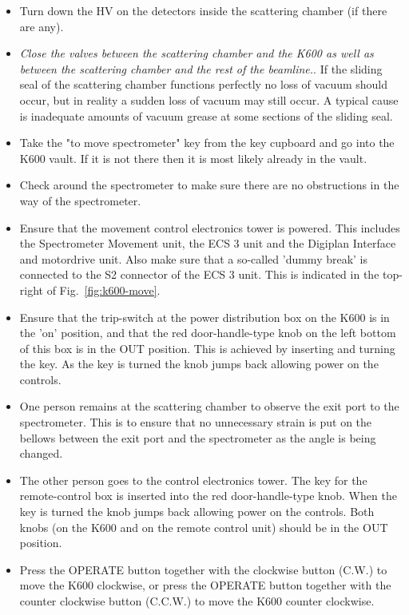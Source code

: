 \documentclass[11pt]{report}
\begin{document}
\begin{itemize}
\item Turn down the HV on the detectors inside the scattering chamber
(if there are any).
\item {\it Close the valves between the scattering chamber and the K600
  as well as between the scattering chamber and the rest of the beamline.}. 
  If the sliding seal of the scattering chamber 
  functions perfectly no loss of vacuum should occur, but in reality
  a sudden loss of vacuum may still occur. A typical cause
  is inadequate amounts of vacuum grease at some sections of the sliding seal.
\item Take the "to move spectrometer" key from the key cupboard and go
  into the K600 vault. If it is not there then it is most likely already in the vault.
\item Check around the spectrometer to make sure there are no 
  obstructions in the way of the spectrometer.     
\item Ensure that the movement control electronics tower is powered. This
  includes the Spectrometer Movement unit, the ECS 3 unit and the Digiplan 
  Interface and motordrive unit. 
  Also make sure that a so-called
  'dummy break' is connected to the S2 connector of the ECS 3 unit.
  This is indicated in the top-right of Fig.~\ref{fig:k600-move}.
\item Ensure that the trip-switch
  at the power distribution box on the K600 
  is in the 'on' position, and that the red door-handle-type knob
  on the left bottom of this  box is in the OUT position.
  This is achieved by inserting and turning the key. As the key is turned the 
  knob jumps back allowing power on the controls.
\item   One person remains at the scattering chamber to observe the 
  exit port to the spectrometer. This is to ensure that no unnecessary 
  strain is put on the bellows between the exit port and the spectrometer
  as the angle is being changed.
\item   The other person goes to the control electronics tower.
  The key for the remote-control box is inserted into the red door-handle-type knob. 
  When the key is turned the knob jumps back allowing power on the controls.
  Both knobs (on the K600 and on the remote control unit) should be in the OUT 
  position.
\item Press the OPERATE button together with the clockwise button (C.W.) to
  move the K600 clockwise, or press the OPERATE button together with the counter
  clockwise button (C.C.W.) to move the K600 counter clockwise.

\end{itemize}
\end{document}
